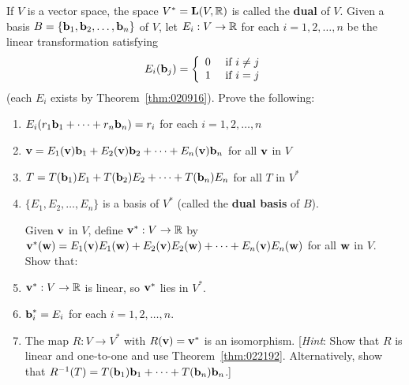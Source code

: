 \begin{multicols}{1}
\begin{ex}
If $V$ is a vector space, the space $V^{*} = \textbf{L}(V, \mathbb{R})$ is called the \textbf{dual} of $V$. Given a basis $B = \{\textbf{b}_{1}, \textbf{b}_{2}, \dots, \textbf{b}_{n}\}$ of $V$, let $E_{i} : V \to \mathbb{R}$ for each $i = 1, 2, \dots, n$ be the linear transformation satisfying
\begin{equation*}
E_i(\textbf{b}_j) = \left\{ \begin{array}{ll} 0 & \mbox{ if } i \neq j \\ 1 & \mbox{ if } i = j \end{array} \right.
\end{equation*}
(each $E_{i}$ exists by Theorem~\ref{thm:020916}). Prove the following:


\begin{enumerate}[label={\alph*.}]
\item $E_{i}(r_{1}\textbf{b}_{1} + \cdots + r_{n}\textbf{b}_{n}) = r_{i}$ for each $i = 1, 2, \dots, n$

\item $\textbf{v} = E_{1}(\textbf{v})\textbf{b}_{1} + E_{2}(\textbf{v})\textbf{b}_{2} + \cdots + E_{n}(\textbf{v})\textbf{b}_{n}$ for all $\textbf{v}$ in $V$

\item $T = T(\textbf{b}_{1})E_{1} + T(\textbf{b}_{2})E_{2} + \cdots + T(\textbf{b}_{n})E_{n}$ for all $T$ in $V^{*}$

\item $\{E_{1}, E_{2}, \dots, E_{n}\}$ is a basis of $V^{*}$ (called the \textbf{dual basis} of $B$).


Given $\textbf{v}$ in $V$, define $\textbf{v}^{*} : V \to \mathbb{R}$ by \\ $\textbf{v}^{*}(\textbf{w}) = E_{1}(\textbf{v})E_{1}(\textbf{w}) + E_{2}(\textbf{v})E_{2}(\textbf{w}) + \cdots + E_{n}(\textbf{v})E_{n}(\textbf{w})$ for all $\textbf{w}$ in $V$. Show that:

\item $\textbf{v}^{*} : V \to \mathbb{R}$ is linear, so $\textbf{v}^{*}$ lies in $V^{*}$.

\item $\textbf{b}_i^{*} = E_{i}$ for each $i = 1, 2, \dots, n$.

\item The map $R : V \to V^{*}$ with $R(\textbf{v}) = \textbf{v}^{*}$ is an isomorphism. [\textit{Hint}: Show that $R$ is linear and one-to-one and use Theorem~\ref{thm:022192}. Alternatively, show that $R^{-1}(T) = T(\textbf{b}_{1})\textbf{b}_{1} + \cdots + T(\textbf{b}_{n})\textbf{b}_{n}$.]


\end{enumerate}
\end{ex}
\end{multicols}
